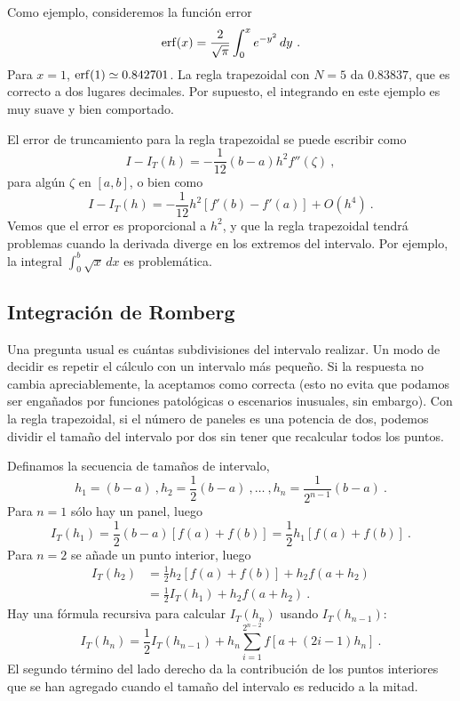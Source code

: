 \documentclass[12pt]{article}
\begin{document}
Como ejemplo, consideremos la funci\'on error
\begin{equation}
  \operatorname{erf}(x) = \frac 2{\sqrt{\pi}} \int_0^x e^{-y^2} \, dy \ . 
\end{equation}
Para $x=1$, $\operatorname{erf}(1) \simeq 0.842701$. La regla trapezoidal con $N=5$
da $0.83837$, que es correcto a dos lugares decimales. Por supuesto,
el integrando en este ejemplo es muy suave y bien comportado.

El error de truncamiento para la regla trapezoidal se puede escribir
como
\begin{equation}
 I - I_T(h) = - \frac 1{12} (b-a) h^2 f''(\zeta) \ , 
\end{equation}
para alg\'un $\zeta$ en $[a,b]$, o bien como
\begin{equation}
\label{error2}
  I-I_T(h) = -\frac 1{12} h^2[f'(b)-f'(a)]+O(h^4) \ . 
\end{equation}
Vemos que el error es proporcional a $h^2$, y que la regla trapezoidal
tendr\'a problemas cuando la derivada diverge en los extremos del
intervalo. Por ejemplo, la integral $\int_0^b \sqrt{x}\, dx$ es
problem\'atica. 

\subsection{Integraci\'on de Romberg}

Una pregunta usual es  cu\'antas subdivisiones del intervalo
realizar. Un modo de decidir es repetir el c\'alculo con un intervalo
m\'as peque\~no. Si la respuesta no cambia apreciablemente, la
aceptamos como correcta (esto no evita que podamos ser enga\~nados por
funciones patol\'ogicas o escenarios inusuales, sin embargo). Con la
regla trapezoidal, si el n\'umero de paneles es una potencia de dos,
podemos dividir el tama\~no del intervalo por dos sin tener que
recalcular todos los puntos.

Definamos la secuencia de tama\~nos de intervalo,
\begin{equation}
  h_1 = (b-a) \ , h_2 = \frac 12(b-a) \ , \ldots \ , h_n = \frac
  1{2^{n-1}} (b-a) \ . 
\end{equation}
Para $n=1$ s\'olo hay un panel, luego
\begin{equation*}
  I_T(h_1) = \frac 12(b-a)[f(a)+f(b)] = \frac 12 h_1[f(a)+f(b)] \ . 
\end{equation*}
Para $n=2$ se a\~nade un punto interior, luego
\begin{align*}
  I_T(h_2) &=\frac 12 h_2[f(a)+f(b)]+h_2f(a+h_2) \\
& = \frac 12 I_T(h_1) + h_2f(a+h_2) \ .
\end{align*}
Hay una f\'ormula recursiva para calcular $I_T(h_n)$ usando
$I_T(h_{n-1})$:
\begin{equation}
  I_T(h_n) = \frac 12I_T(h_{n-1}) + h_n \sum_{i=1}^{2^{n-2}}
  f[a+(2i-1)h_n] \ . 
\end{equation}
El segundo t\'ermino del lado derecho da la contribuci\'on de los
puntos interiores que se han agregado cuando el tama\~no del intervalo
es reducido a la mitad. 
\end{document}
